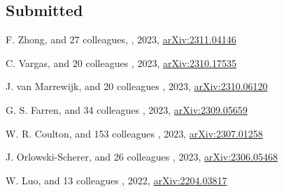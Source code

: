 

\subsection*{Submitted}

\begin{etaremune}

\item
F. Zhong, and 27 colleagues,
,
2023, \href{https://ui.adsabs.harvard.edu/abs/2023arXiv231104146Z}{arXiv:2311.04146}
\submitted{\mnras}

\item
C. Vargas, and 20 colleagues
,
2023, \href{https://ui.adsabs.harvard.edu/abs/2023arXiv231017535V}{arXiv:2310.17535}
\submitted{\apj}

\item
J. van Marrewijk, and 20 colleagues
,
2023, \href{https://ui.adsabs.harvard.edu/abs/2023arXiv231006120V}{arXiv:2310.06120}
\submitted{\aap}

\item
G. S. Farren, and 34 colleagues
,
2023, \href{https://ui.adsabs.harvard.edu/abs/2023arXiv230905659F}{arXiv:2309.05659}
\submitted{\apj}

\item
W. R. Coulton, and 153 colleagues
,
2023, \href{https://ui.adsabs.harvard.edu/abs/2023arXiv230701258C}{arXiv:2307.01258}
\submitted{\apj}

\item
J. Orlowski-Scherer, and 26 colleagues
,
2023, \href{https://ui.adsabs.harvard.edu/abs/2023arXiv230605468O}{arXiv:2306.05468}
\submitted{\aap}

\item
W. Luo, and 13 colleagues
,
2022, \href{https://ui.adsabs.harvard.edu/abs/2022arXiv220403817L}{arXiv:2204.03817}
\submitted{\mnras}

\end{etaremune}

